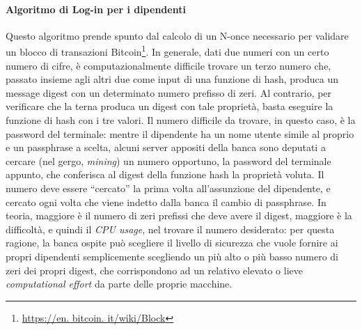 





\paragraph{Algoritmo di Log-in per i dipendenti}
Questo algoritmo prende spunto dal calcolo di un N-once necessario per validare un blocco di transazioni Bitcoin\footnote{\url{https://en. bitcoin. it/wiki/Block}}.
In generale, dati due numeri con un certo numero di cifre, è computazionalmente difficile trovare un terzo numero che, passato insieme agli altri due come input di una funzione di hash, produca un message digest con un determinato numero prefisso di zeri.
Al contrario, per verificare che la terna produca un digest con tale proprietà, basta eseguire la funzione di hash con i tre valori.
Il numero difficile da trovare, in questo caso, è la password del terminale: mentre il dipendente ha un nome utente simile al proprio e un passphrase a scelta, alcuni server appositi della banca sono deputati a cercare (nel gergo, \emph{mining}) un numero opportuno, la password del terminale appunto, che conferisca al digest della funzione hash la proprietà voluta.
Il numero deve essere ``cercato'' la prima volta all'assunzione del dipendente, e cercato ogni volta che viene indetto dalla banca il cambio di passphrase.
In teoria, maggiore è il numero di zeri prefissi che deve avere il digest, maggiore è la difficoltà, e quindi il \emph{CPU usage}, nel trovare il numero desiderato: per questa ragione, la banca ospite può scegliere il livello di sicurezza che vuole fornire ai propri dipendenti semplicemente scegliendo un più alto o più basso numero di zeri dei propri digest, che corrispondono ad un relativo elevato o lieve \emph{computational effort} da parte delle proprie macchine.







